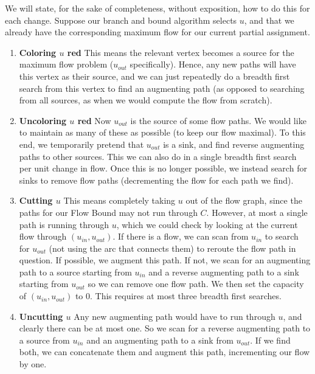 \documentclass{article}
\begin{document}
	We will state, for the sake of completeness,
	without exposition, how to do this for each change. Suppose
	our branch and bound algorithm selects $u$, and that we already have the
	corresponding maximum flow for our current partial assignment.
	\begin{enumerate}
		\item[] \textbf{Coloring $u$ red} This means the relevant vertex
			becomes a source for the maximum flow problem ($u_{out}$
			specifically). Hence, any new paths will have this vertex as their
			source, and we can just repeatedly do a breadth first search from
			this vertex to find an augmenting path (as opposed to searching
			from all sources, as when we would compute the flow from scratch).
		\item[] \textbf{Uncoloring $u$ red} Now $u_{out}$ is the source of 
			some flow paths. We would like to maintain as many of these as
			possible (to keep our flow maximal). To this end, we temporarily
			pretend that $u_{out}$ is a sink, and find reverse augmenting paths
			to other sources. This we can also do in a single breadth first
			search per unit change in flow. Once this is no longer possible,
			we instead search for sinks to remove flow paths (decrementing the
			flow for each path we find).
		\item[] \textbf{Cutting $u$} This means completely taking $u$ out of
			the flow graph, since the paths for our Flow Bound may not run
			through $C$. However, at most a single path is running through
			$u$, which we could check by looking at the current flow through
			$(u_{in}, u_{out})$. If there is a flow, we can scan from $u_{in}$
			to search for $u_{out}$ (not using the arc that connects them) to
			reroute the flow path in question. If possible, we augment this
			path. If not, we scan for an augmenting path to a source starting
			from $u_{in}$ and a reverse augmenting path to a
			sink starting from $u_{out}$ so we can remove one flow path. We
			then set the capacity of $(u_{in}, u_{out})$ to $0$. This requires
			at most three breadth first searches.
		\item[] \textbf{Uncutting $u$} Any new augmenting path would have to
			run through $u$, and clearly there can be at most one. So we scan
			for a reverse augmenting path to a source from $u_{in}$ and an
			augmenting path to a sink from $u_{out}$. If we find both, we can
			concatenate them and augment this path, incrementing our flow by
			one.
	\end{enumerate}
\end{document}
